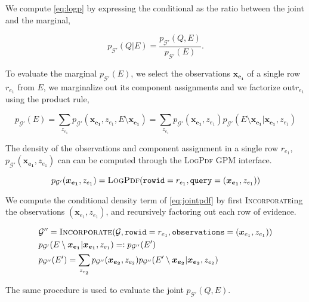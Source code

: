 \documentclass{article}
\newcommand{\mG}{\mathcal{G}}
\begin{document}
We compute \eqref{eq:logp} by expressing the conditional as the
ratio between the joint and the marginal,

\begin{equation}
  \label{eq:pdfmulti}
  p_{\mG'}(Q|E) 
    = \frac{p_{\mG'}(Q, E)}{p_{\mG'}(E)}.
\end{equation}

To evaluate the marginal $p_{\mG'}(E)$, we select the observations $\bm{x_{e_1}}$ of a single row $r_{e_1}$ from $E$, we marginalize out its component assignments and we factorize out$r_{e_1}$ using the product rule,

\begin{equation}
  \label{eq:jointpdf}
  p_{\mG'}(E) = \sum_{z_{e_1}} p_{\mG'}(\bm{x_{e_1}}, z_{e_1}, E \setminus{\bm{x_{e_1}}})
    = \sum_{z_{e_1}} p_{\mG'}(\bm{x_{e_1}}, z_{e_1}) p_{\mG'}(E \setminus \bm{x_{e_1}} | \bm{x_{e_1}}, z_{e_1})
\end{equation}

The density of the observations and component assignment in a single row $r_{e_1}$, $p_{\mG'}(\bm{x_{e_1}}, z_{e_1})$ can can be computed through the \textsc{LogPdf} GPM interface.

\begin{equation*}
  p_{\mG'}(\bm{x_{e_1}}, z_{e_1}) = \textsc{LogPdf}(
    \texttt{rowid}=r_{e_1}, \texttt{query}=(\bm{x_{e_1}}, z_{e_1}))
\end{equation*}

 We compute the conditional density term of \eqref{eq:jointpdf} by first \textsc{Incorporate}ing the observations $(\bm{x}_{e_1}, z_{e_1})$, and recursively factoring out each row of evidence.

\begin{align*}
  &\mG'' = \textsc{Incorporate}(\mG, \texttt{rowid}=r_{e_1}, \texttt{observations}=(\bm{x}_{e_1},z_{e_1}))\\
   &p_{\mG'}(E \setminus \bm{x_{e_1}} | \bm{x_{e_1}}, z_{e_1}) =: p_{\mG''}(E') \\
  &p_{\mG''}(E') = \sum_{z_{e_2}} p_{\mG''}(\bm{x_{e_2}}, z_{e_2}) p_{\mG''}(E' \setminus \bm{x_{e_2}} | \bm{x_{e_2}}, z_{e_2})
\end{align*}

The same procedure is used to evaluate the joint $p_{\mG'}(Q,E)$. 
\end{document}
